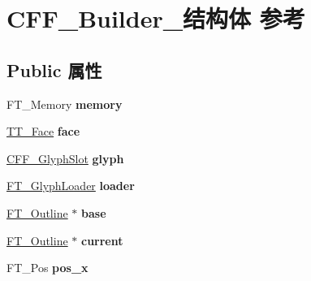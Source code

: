 \hypertarget{struct_c_f_f___builder__}{}\section{C\+F\+F\+\_\+\+Builder\+\_\+结构体 参考}
\label{struct_c_f_f___builder__}
\subsection*{Public 属性}
\begin{DoxyCompactItemize}
\item 
\mbox{\label{struct_c_f_f___builder___a41fce66940ca6e0a746f0839d076142f}} 
F\+T\+\_\+\+Memory {\bfseries memory}
\item 
\mbox{\label{struct_c_f_f___builder___a415e44897a8329823ff2cea2990d8935}} 
\hyperlink{struct_t_t___face_rec__}{T\+T\+\_\+\+Face} {\bfseries face}
\item 
\mbox{\label{struct_c_f_f___builder___a527ba659637b4e50be221d8b00d337c8}} 
\hyperlink{struct_c_f_f___glyph_slot_rec__}{C\+F\+F\+\_\+\+Glyph\+Slot} {\bfseries glyph}
\item 
\mbox{\label{struct_c_f_f___builder___a358be6966e4199e54d5551f81f496a5b}} 
\hyperlink{struct_f_t___glyph_loader_rec__}{F\+T\+\_\+\+Glyph\+Loader} {\bfseries loader}
\item 
\mbox{\label{struct_c_f_f___builder___a7c351f6ae7233c249f85f2371d809bac}} 
\hyperlink{struct_f_t___outline__}{F\+T\+\_\+\+Outline} $\ast$ {\bfseries base}
\item 
\mbox{\label{struct_c_f_f___builder___acd27e804cd32054865ef4236e7f9dc93}} 
\hyperlink{struct_f_t___outline__}{F\+T\+\_\+\+Outline} $\ast$ {\bfseries current}
\item 
\mbox{\label{struct_c_f_f___builder___a045d91695d51a1fbfa307aab507fa46b}} 
F\+T\+\_\+\+Pos {\bfseries pos\+\_\+x}
\item 
\mbox{\label{struct_c_f_f___builder___a50a8bec8b857853829f42195101db472}} 

\end{DoxyCompactItemize}
